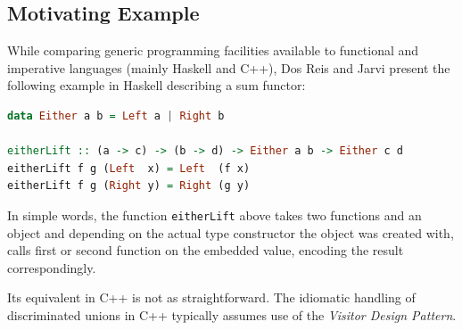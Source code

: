 \documentclass[preprint]{sigplanconf}
\DeclareRobustCommand{\codehaskell}[1]{{\lstinline[breaklines=false,language=Haskell]{#1}}}
\begin{document}


\subsection{Motivating Example}
\label{sec:xmpl}

While comparing generic programming facilities available to functional and 
imperative languages (mainly Haskell and C++), Dos Reis and Jarvi present the 
following example in Haskell describing a sum functor\cite{DRJ05}:

\begin{lstlisting}[language=Haskell]
data Either a b = Left a | Right b

eitherLift :: (a -> c) -> (b -> d) -> Either a b -> Either c d
eitherLift f g (Left  x) = Left  (f x)
eitherLift f g (Right y) = Right (g y)
\end{lstlisting}

In simple words, the function \codehaskell{eitherLift} above takes two functions and an 
object and depending on the actual type constructor the object was created with, 
calls first or second function on the embedded value, encoding the result 
correspondingly.

Its equivalent in C++ is not as straightforward. The idiomatic handling of 
discriminated unions in C++ typically assumes use of the \emph{Visitor Design 
Pattern}\cite{DesignPatterns1993}.
\end{document}
